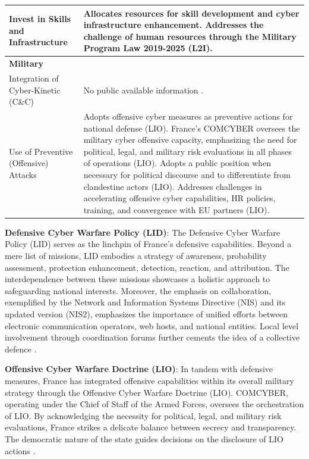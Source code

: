 \begin{table}[h]
\begin{tabular}{>{\raggedright}p{4cm} p{11cm}}
\hspace{0.2cm} Invest in Skills and Infrastructure & Allocates resources for skill development and cyber infrastructure enhancement. Addresses the challenge of human resources through the Military Program Law 2019-2025 (L2I). \\
\midrule
\textbf{Military} & \\
\hspace{0.2cm} Integration of Cyber-Kinetic (C\&C) & No public available information . \\
\hspace{0.2cm} Use of Preventive (Offensive) Attacks & Adopts offensive cyber measures as preventive actions for national defense (LIO). France's COMCYBER oversees the military cyber offensive capacity, emphasizing the need for political, legal, and military risk evaluations in all phases of operations (LIO). Adopts a public position when necessary for political discourse and to differentiate from clandestine actors (LIO). Addresses challenges in accelerating offensive cyber capabilities, HR policies, training, and convergence with EU partners (LIO). \\
\bottomrule
\end{tabular}
\end{table}


\textbf{Defensive Cyber Warfare Policy (LID)}: The Defensive Cyber Warfare Policy (LID) serves as the linchpin of France's defensive capabilities. Beyond a mere list of missions, LID embodies a strategy of awareness, probability assessment, protection enhancement, detection, reaction, and attribution. The interdependence between these missions showcases a holistic approach to safeguarding national interests. Moreover, the emphasis on collaboration, exemplified by the Network and Information Systems Directive (NIS) and its updated version (NIS2), emphasizes the importance of unified efforts between electronic communication operators, web hosts, and national entities. Local level involvement through coordination forums further cements the idea of a collective defence \autocite{ministredesarmes_2019_politique}.

\textbf{Offensive Cyber Warfare Doctrine (LIO)}: In tandem with defensive measures, France has integrated offensive capabilities within its overall military strategy through the Offensive Cyber Warfare Doctrine (LIO). COMCYBER, operating under the Chief of Staff of the Armed Forces, oversees the orchestration of LIO. By acknowledging the necessity for political, legal, and military risk evaluations, France strikes a delicate balance between secrecy and transparency. The democratic nature of the state guides decisions on the disclosure of LIO actions \autocite{ministredesarmes_2019_lments}.

